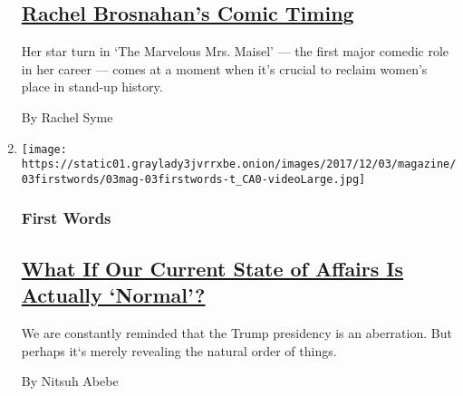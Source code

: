 \begin{enumerate}
  \hypertarget{rachel-brosnahans-comic-timing}{%
  \subsection{\texorpdfstring{\href{/2017/11/28/magazine/rachel-brosnahans-comic-timing.html}{Rachel
  Brosnahan's Comic
  Timing}}{Rachel Brosnahan's Comic Timing}}\label{rachel-brosnahans-comic-timing}}

  Her star turn in `The Marvelous Mrs. Maisel' --- the first major
  comedic role in her career --- comes at a moment when it's crucial to
  reclaim women's place in stand-up history.

  By Rachel Syme
\item
  \texttt{[image: https://static01.graylady3jvrrxbe.onion/images/2017/12/03/magazine/03firstwords/03mag-03firstwords-t\_CA0-videoLarge.jpg]}

  \hypertarget{first-words}{%
  \subsubsection{First Words}\label{first-words}}

  \hypertarget{what-if-our-current-state-of-affairs-is-actually-normal}{%
  \subsection{\texorpdfstring{\href{/2017/11/28/magazine/what-if-our-current-state-of-affairs-is-actually-normal.html}{What
  If Our Current State of Affairs Is Actually
  `Normal'?}}{What If Our Current State of Affairs Is Actually `Normal'?}}\label{what-if-our-current-state-of-affairs-is-actually-normal}}

  We are constantly reminded that the Trump presidency is an aberration.
  But perhaps it`s merely revealing the natural order of things.

  By Nitsuh Abebe
\end{enumerate}

